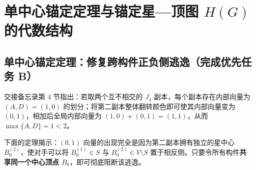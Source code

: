\documentclass[11pt,a4paper]{ctexart}
\theoremstyle{definition}
\newcommand{\1}{\boldsymbol 1}
\newcommand{\0}{\boldsymbol 0}
\begin{document}
\section{单中心锚定定理与锚定星—顶图 $H(G)$ 的代数结构}

\subsection{单中心锚定定理：修复跨构件正负侧逃逸（完成优先任务 B）}
交接备忘录第 4 节指出：若取两个互不相交的 $J_4$ 副本，每个副本存在内部向量为 $(A,D)=(1,0)$ 的划分；将第二副本整体翻转颜色即可使其内部向量变为 $(0,1)$，相加后全局内部向量为 $(1,0)+(0,1)=(1,1)$，从而 $\max\{A,D\}=1<2$。

下面的定理揭示：$(0,1)$ 向量的出现完全是因为第二副本拥有独立的星中心 $B_0^{(2)}$，使对手可以将 $B_0^{(1)}\in S$ 与 $B_0^{(2)}\in V\setminus S$ 置于相反侧。只要令所有构件\textbf{共享同一个中心顶点 $B_0$}，即可彻底阻断该逃逸。
\end{document}
